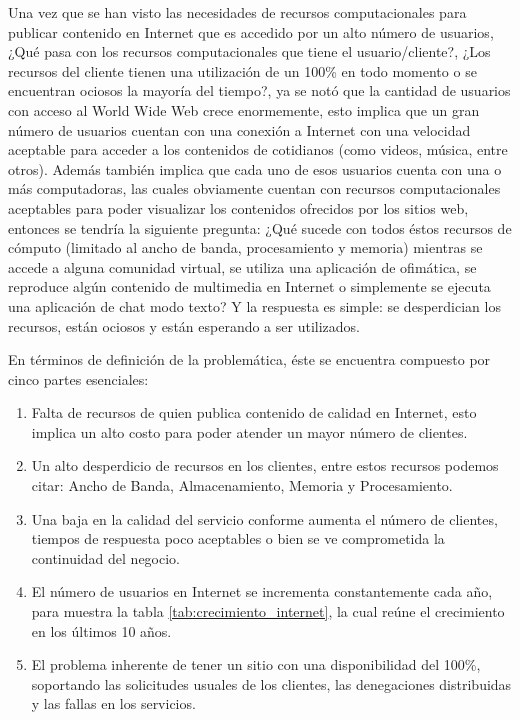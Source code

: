 Una vez que se han visto las necesidades de recursos computacionales para publicar contenido en Internet que es accedido por un alto número de usuarios, ¿Qué pasa con los recursos computacionales que tiene el usuario/cliente?, ¿Los recursos del cliente tienen una utilización de un 100\% en todo momento o se encuentran ociosos la mayoría del tiempo?, ya se notó que la cantidad de usuarios con acceso al World Wide Web crece enormemente, esto implica que un gran número de usuarios cuentan con una conexión a Internet con una velocidad aceptable para acceder a los contenidos de cotidianos (como videos, música, entre otros). Además también implica que cada uno de esos usuarios cuenta con una o más computadoras, las cuales obviamente cuentan con recursos computacionales aceptables para poder visualizar los contenidos ofrecidos por los sitios web, entonces se tendría la siguiente pregunta: ¿Qué sucede con todos éstos recursos de cómputo (limitado al ancho de banda, procesamiento y memoria) mientras se accede a alguna comunidad virtual, se utiliza una aplicación de ofimática, se reproduce algún contenido de multimedia en Internet o simplemente se ejecuta una aplicación de chat modo texto?  Y la respuesta es simple: se desperdician los recursos, están ociosos y están esperando a ser utilizados.

En términos de definición de la problemática, éste se encuentra compuesto por cinco partes esenciales:
\begin{enumerate}
\item Falta de recursos de quien publica contenido de calidad en Internet, esto implica un alto costo para poder atender un mayor número de clientes.
\item Un alto desperdicio de recursos en los clientes, entre estos recursos podemos citar: Ancho de Banda, Almacenamiento, Memoria y Procesamiento.
\item Una baja en la calidad del servicio conforme aumenta el número de clientes, tiempos de respuesta poco aceptables o bien se ve comprometida la continuidad del negocio. 
\item El número de usuarios en Internet se incrementa constantemente cada año, para muestra la tabla \ref{tab:crecimiento_internet}, la cual reúne el crecimiento en los últimos 10 años.
\item El problema inherente de tener un sitio con una disponibilidad del 100\%, soportando las solicitudes usuales de los clientes, las denegaciones distribuidas y las fallas en los servicios. 
\end{enumerate}

